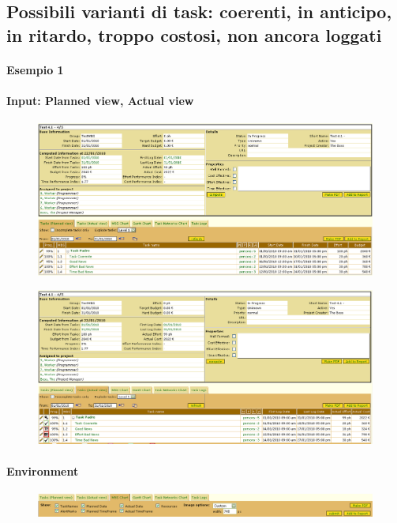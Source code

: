 \subsection{Possibili varianti di task: coerenti, in anticipo, in ritardo, troppo costosi, non ancora loggati}

\paragraph{Esempio 1}
\paragraph{Input: Planned view, Actual view}
\begin{figure}[h!]
\centering
\includegraphics[width=\textwidth]{tests/TEST_WBS/4.1/4.1_4_5/Esempio_1/input.png}
\end{figure}
\begin{figure}[h!]
\centering
\includegraphics[width=\textwidth]{tests/TEST_WBS/4.1/4.1_4_5/Esempio_1/input_actual.png}
\end{figure}
\newpage

\paragraph{Environment}
\begin{figure}[h!]
\centering
\includegraphics[width=\textwidth]{tests/TEST_WBS/4.1/4.1_4_5/Esempio_1/environment.png}
\end{figure}

